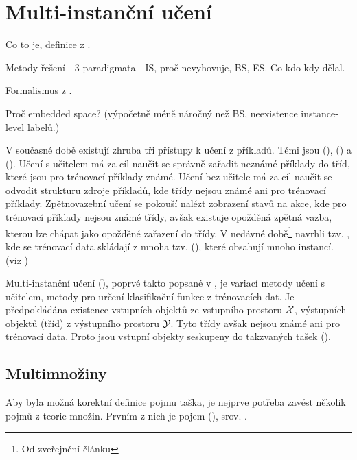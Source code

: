 \chapter{Multi-instanční učení}\label{MIL}

Co to je, definice z \cite{dietterich_solving_1997}.

Metody řešení - 3 paradigmata - IS, proč nevyhovuje, BS, ES. Co kdo kdy dělal.

Formalismus z \cite{pevny_using_2016}.

Proč embedded space? (výpočetně méně náročný než BS, neexistence instance-level labelů.)

\null

V současné době existují zhruba tři přístupy k učení z příkladů. Těmi jsou  (),  () a  (). Učení s učitelem má za cíl naučit se správně zařadit neznámé příklady do tříd, které jsou pro trénovací příklady známé. Učení bez učitele má za cíl naučit se odvodit strukturu zdroje příkladů, kde třídy nejsou známé ani pro trénovací příklady. Zpětnovazební učení se pokouší nalézt zobrazení stavů na akce, kde pro trénovací příklady nejsou známé třídy, avšak existuje opožděná zpětná vazba, kterou lze chápat jako opožděné zařazení do třídy. V nedávné době\footnote{Od zveřejnění článku} \cite{dietterich_solving_1997} navrhli tzv. , kde se trénovací data skládají z mnoha tzv.  (), které obsahují mnoho instancí. (viz \cite{zhou_neural_2002})

Multi-instanční učení (), poprvé takto popsané v \cite{dietterich_solving_1997}, je variací metody učení s učitelem, metody pro určení klasifikační funkce z trénovacích dat. Je předpokládána existence vstupních objektů ze vstupního prostoru \( \mathcal X \), výstupních objektů (tříd) z výstupního prostoru \( \mathcal Y \). Tyto třídy avšak nejsou známé ani pro trénovací data. Proto jsou vstupní objekty seskupeny do takzvaných tašek ().

\section{Multimnožiny}

Aby byla možná korektní definice pojmu taška, je nejprve potřeba zavést několik pojmů z teorie množin. Prvním z nich je pojem  (), srov. \cite{knuth_art_1968}.

